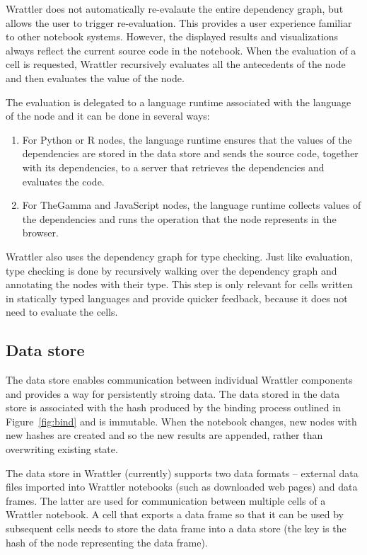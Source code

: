 \documentclass[sigplan]{acmart}\settopmatter{printfolios=true,printccs=false,printacmref=false}
\begin{document}
Wrattler does not automatically re-evalaute the entire dependency graph, but allows the user to
trigger re-evaluation. This provides a user experience familiar to other notebook systems. 
However, the displayed results and visualizations always reflect the current source code in the
notebook. When the evaluation of a cell is requested, Wrattler recursively evaluates all the 
antecedents of the node and then evaluates the value of the node. 

The evaluation is delegated to a language
runtime associated with the language of the node and it can be done in several ways:
%
\begin{enumerate}
\item For Python or R nodes, the language runtime ensures that the values of the dependencies
  are stored in the data store and sends the source code, together with its dependencies, to a
  server that retrieves the dependencies and evaluates the code.
\item For TheGamma and JavaScript nodes, the language runtime collects values of the 
  dependencies and runs the operation that the node represents in the browser.
\end{enumerate}
%
Wrattler also uses the dependency graph for type checking. Just like evaluation, type checking
is done by recursively walking over the dependency graph and annotating the nodes with their 
type. This step is only relevant for cells written in statically typed languages and provide
quicker feedback, because it does not need to evaluate the cells.

\subsection{Data store}
\label{sec:comp-data}

The data store enables communication between individual Wrattler components and provides a way for 
persistently stroing data. The data stored in the data store is associated with the hash 
produced by the binding process outlined in Figure~\ref{fig:bind} and is immutable. When the
notebook changes, new nodes with new hashes are created and so the new results are appended,
rather than overwriting existing state.

The data store in Wrattler (currently) supports two data formats -- external data files imported
into Wrattler notebooks (such as downloaded web pages) and data frames. The latter are used for
communication between multiple cells of a Wrattler notebook. A cell that exports a data frame
so that it can be used by subsequent cells needs to store the data frame into a data store (the
key is the hash of the node representing the data frame). 
\end{document}
